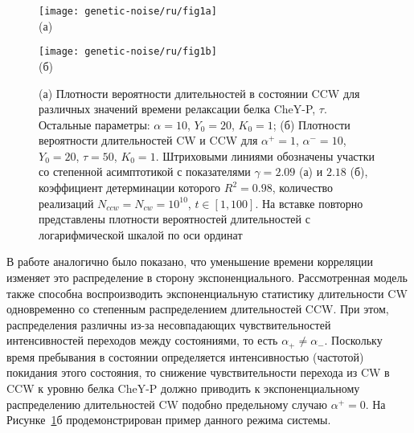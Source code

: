 \begin{figure}[ht]
    \begin{minipage}[b][][b]{0.47\linewidth}\centering
        \texttt{[image: genetic-noise/ru/fig1a]} \\ (а)
    \end{minipage}
    \hfill
    \begin{minipage}[b][][b]{0.47\linewidth}\centering
        \texttt{[image: genetic-noise/ru/fig1b]} \\ (б)
    \end{minipage}
    \caption{
        (а) Плотности вероятности длительностей в состоянии CCW для различных значений времени релаксации белка CheY-P, $\tau$. Остальные параметры: $\alpha = 10$, $Y_0 = 20$, $K_0 = 1$; (б) Плотности вероятности длительностей CW и CCW для $\alpha^+ = 1$, $\alpha^- = 10$, $Y_0 = 20$, $\tau = 50$, $K_0 = 1$. Штриховыми линиями обозначены участки со степенной асимптотикой с показателями $\gamma = 2.09$ (а) и $2.18$ (б), коэффициент детерминации которого $R^2 = 0.98$, количество реализаций $N_{ccw} = N_{cw} = 10^{10}$, $t \in [1, 100]$. На вставке повторно представлены плотности вероятностей длительностей с логарифмической шкалой по оси ординат
    }
    \label{fig:duration-pdf}
\end{figure}


В работе \cite{tu_how_2005} аналогично было показано, что уменьшение времени корреляции изменяет это распределение в сторону экспоненциального. Рассмотренная модель также способна воспроизводить экспоненциальную статистику длительности CW одновременно со степенным распределением длительностей CCW. При этом, распределения различны из-за несовпадающих чувствительностей интенсивностей переходов между состояниями, то есть $\alpha_+ \neq \alpha_-$. Поскольку время пребывания в состоянии определяется интенсивностью (частотой) покидания этого состояния, то снижение чувствительности перехода из CW в CCW к уровню белка CheY-P должно приводить к экспоненциальному распределению длительностей CW подобно предельному случаю $\alpha^+ = 0$. На Рисунке~\cref{fig:duration-pdf}б продемонстрирован пример данного режима системы.

